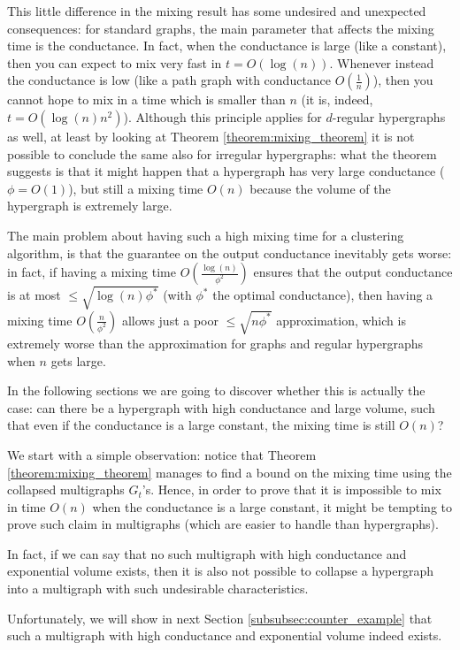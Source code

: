 \documentclass[../main.tex]{subfiles}
\begin{document}
This little difference in the mixing result has some undesired and unexpected consequences: for standard graphs, the main parameter that affects the mixing time is the conductance. In fact, when the conductance is large (like a constant), then you can expect to mix very fast in $t=O(\log(n))$. Whenever instead the conductance is low (like a path graph with conductance $O\left(\frac{1}{n}\right)$), then you cannot hope to mix in a time which is smaller than $n$ (it is, indeed, $t=O(\log(n)n^2)$). Although this principle applies for $d$-regular hypergraphs as well, at least by looking at Theorem \ref{theorem:mixing_theorem} it is not possible to conclude the same also for irregular hypergraphs: what the theorem suggests is that it might happen that a hypergraph has very large conductance ($\phi=O(1)$), but still a mixing time $O(n)$ because the volume of the hypergraph is extremely large. 

The main problem about having such a high mixing time for a clustering algorithm, is that the guarantee on the output conductance inevitably gets worse: in fact, if having a mixing time $O\left(\frac{\log(n)}{\phi^2}\right)$ ensures that the output conductance is at most $\leq \sqrt{\log(n) \phi^*}$ (with $\phi^*$ the optimal conductance), then having a mixing time $O\left(\frac{n}{\phi^2}\right)$ allows just a poor $\leq \sqrt{n \phi^*}$ approximation, which is extremely worse than the approximation for graphs and regular hypergraphs when $n$ gets large.

In the following sections we are going to discover whether this is actually the case: can there be a hypergraph with high conductance and large volume, such that even if the conductance is a large constant, the mixing time is still $O(n)$?

We start with a simple observation: notice that Theorem \ref{theorem:mixing_theorem} manages to find a bound on the mixing time using the collapsed multigraphs $G_t$'s. Hence, in order to prove that it is impossible to mix in time $O(n)$ when the conductance is a large constant, it might be tempting to prove such claim in multigraphs (which are easier to handle than hypergraphs).

In fact, if we can say that no such multigraph with high conductance and exponential volume exists, then it is also not possible to collapse a hypergraph into a multigraph with such undesirable characteristics.

Unfortunately, we will show in next Section \ref{subsubsec:counter_example} that such a multigraph with high conductance and exponential volume indeed exists.
\end{document}
